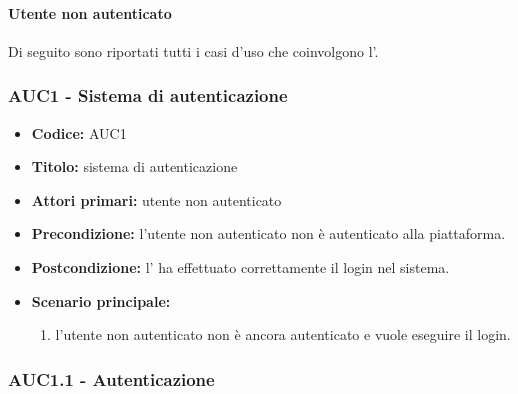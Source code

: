 \documentclass[casi-duso]{subfiles}
\begin{document}
\paragraph{Utente non autenticato}%
\label{par:utente-non-autenticato}
Di seguito sono riportati tutti i casi d'uso che coinvolgono l'.

\subsubsection{AUC1 - Sistema di autenticazione}%
\label{subsub:AUC1}

\begin{itemize}
  \item \textbf{Codice:} AUC1
  \item \textbf{Titolo:} sistema di autenticazione
  \item \textbf{Attori primari:} utente non autenticato
  \item \textbf{Precondizione:} l'utente non autenticato non è autenticato alla piattaforma.
  \item \textbf{Postcondizione:} l' ha effettuato correttamente il login nel sistema.
  \item \textbf{Scenario principale:}
  \begin{enumerate}
    \item l'utente non autenticato non è ancora autenticato e vuole eseguire il login.
  \end{enumerate}
\end{itemize}

\subsubsection{AUC1.1 - Autenticazione}%
\label{subsub:AUC1.1}
\end{document}
